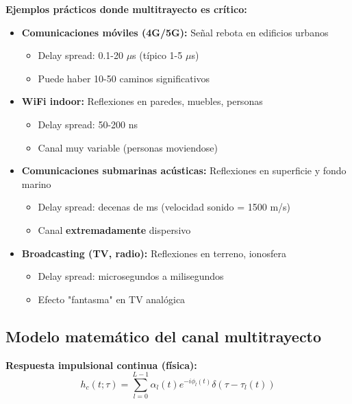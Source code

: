\documentclass[10pt,a4paper]{article}
\begin{document}
\textbf{Ejemplos prácticos donde multitrayecto es crítico:}
\begin{itemize}
\item \textbf{Comunicaciones móviles (4G/5G):} Señal rebota en edificios urbanos
  \begin{itemize}
  \item Delay spread: 0.1-20 $\mu$s (típico 1-5 $\mu$s)
  \item Puede haber 10-50 caminos significativos
  \end{itemize}
\item \textbf{WiFi indoor:} Reflexiones en paredes, muebles, personas
  \begin{itemize}
  \item Delay spread: 50-200 ns
  \item Canal muy variable (personas moviendose)
  \end{itemize}
\item \textbf{Comunicaciones submarinas acústicas:} Reflexiones en superficie y fondo marino
  \begin{itemize}
  \item Delay spread: decenas de ms (velocidad sonido = 1500 m/s)
  \item Canal \textbf{extremadamente} dispersivo
  \end{itemize}
\item \textbf{Broadcasting (TV, radio):} Reflexiones en terreno, ionosfera
  \begin{itemize}
  \item Delay spread: microsegundos a milisegundos
  \item Efecto "fantasma" en TV analógica
  \end{itemize}
\end{itemize}

\subsection{Modelo matemático del canal multitrayecto}

\textbf{Respuesta impulsional continua (física):}
$$\boxed{h_c(t;\tau) = \sum_{l=0}^{L-1} \alpha_l(t) e^{-i\phi_l(t)} \delta(\tau - \tau_l(t))}$$
\end{document}
